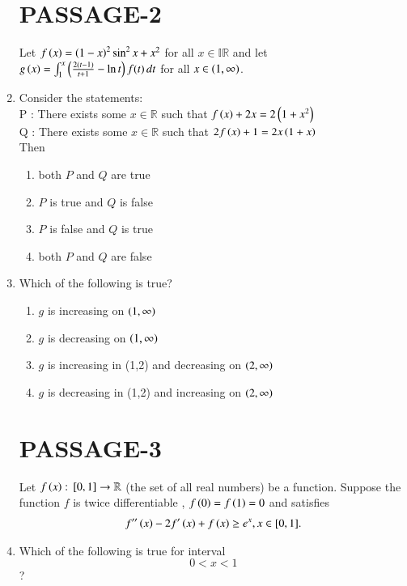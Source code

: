 \documentclass[journal,,12pt,onecolumn]{IEEEtran}
\theoremstyle{remark}
\begin{document}
\begin{enumerate}
\section*{PASSAGE-2}
Let $f\left(x\right)=\left(1-x\right)^2 \sin^2 x + x^2$ for all $x \in \mathbb{IR}$ and let $g\left(x\right)=
\int_{1}^{x} \left(\frac{2(t-1)}{t+1} - \ln t\right)  f(t) \, dt $ for all $x \in \left(1 ,\infty\right)$.
\item Consider the statements:\\
P : There exists some $x \in \mathbb{R}$ such that $f\left(x\right) + 2x = 2\left(1+x^2\right)$\\
Q : There exists some $x \in\mathbb{R}$ such that $2f\left(x\right) + 1 = 2x\left(1+x\right)$\\
    Then
    \hfill{}
\begin{enumerate}
\item both $P$ and $Q$ are true
\item $P$ is true and $Q$ is false
\item $P$ is false and $Q$ is true
\item both $P$ and $Q$ are false
\end{enumerate}



\item Which of the following is true?
\hfill{}
\begin{enumerate}

\item $g$ is increasing on $\left(1,\infty\right)$
\item $g$ is decreasing on $\left(1,\infty\right)$
\item $g$ is increasing in (1,2) and decreasing on $\left(2,\infty\right)$
\item $g$ is decreasing in (1,2) and increasing on $\left(2,\infty\right)$

\end{enumerate}


\section*{PASSAGE-3}
Let $f\left(x\right) : {}\left[0,1\right] \to\mathbb{R}$
(the set of all real numbers) be a function. Suppose the function $f$ is twice differentiable , $f\left(0\right)=f\left(1\right)=0$ and satisfies \begin{align} f''\left(x\right)-2f'\left(x\right)+f\left(x\right) \geq e^x , x \in [0,1].\end{align} 

\item Which of the following is true for interval     $$0<x<1$$?
\hfill{}


\end{enumerate}
\end{document}
